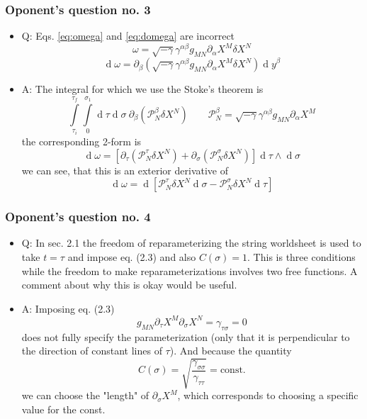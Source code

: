 \documentclass[11pt]{beamer}
\newcommand{\D}[1]{\ensuremath{\operatorname{d}\!{#1}}}
\newcommand{\difs}[3][]{\partial_{#3}^{#1}{#2}}
\newcommand{\lp}{\left(}
\newcommand{\rp}{\right)}
\begin{document}
\begin{frame}
\frametitle{Oponent's question no. 3}
\begin{itemize}
	\item Q: Eqs. \eqref{eq:omega} and \eqref{eq:domega} are incorrect
	\begin{equation}
	\tag{1.19} \label{eq:omega}
	\omega = \sqrt{- \gamma} \gamma^{\alpha \beta} g_{MN} \difs[]{X^M}{\alpha} \delta X^N
	\end{equation}
	\begin{equation}
	\tag{1.20} \label{eq:domega}
	\D \omega = \difs{\lp \sqrt{- \gamma} \gamma^{\alpha \beta} g_{MN} \difs[]{X^M}{\alpha} \delta X^N \rp} {\beta} \D y^{\beta}
	\end{equation}
	\item A: The integral for which we use the Stoke's theorem is
	$$
	\int\limits_{\tau_i}^{\tau_f} \int\limits_{0}^{\sigma_1} \D \tau \D \sigma ~ \difs{\lp \mathcal{P}_N^{\beta} \delta X^N \rp } {\beta} \qquad \mathcal{P}_N^{\beta} = \sqrt{- \gamma} \gamma^{\alpha \beta} g_{MN} \difs[]{X^M}{\alpha}
	$$
	the corresponding 2-form is
	$$
	\D \omega = \left[ \difs{\lp \mathcal{P}_N^{\tau} \delta X^N \rp } {\tau} + \difs{\lp \mathcal{P}_N^{\sigma} \delta X^N \rp } {\sigma} \right] \D \tau \wedge \D \sigma
	$$
	we can see, that this is an exterior derivative of
	$$
	\D \omega = \D {\left[ \mathcal{P}_N^{\tau} \delta X^N \D \sigma - \mathcal{P}_N^{\sigma} \delta X^N \D \tau \right]}
	$$
\end{itemize}
\end{frame}


\begin{frame}
\frametitle{Oponent's question no. 4}
\begin{itemize}
	\item Q: In sec. 2.1 the freedom of reparameterizing the string worldsheet is used to take $t = \tau$
	and impose eq. (2.3) and also $C(\sigma) = 1$. This is three conditions while the freedom
	to make reparameterizations involves two free functions. A comment about why this
	is okay would be useful.
	\item A: Imposing eq. (2.3)
	\begin{equation}\tag{2.3}
		g_{MN} \difs {X^M}{\tau} \difs {X^N}{\sigma} = \gamma_{\tau \sigma} = 0
	\end{equation}
	does not fully specify the parameterization (only that it is perpendicular to the direction of constant lines of $\tau$). And because the quantity
	$$
	C(\sigma) = \sqrt{\frac{\gamma_{\sigma \sigma}}{\gamma_{\tau \tau}}} = \text{const.}
	$$
	we can choose the "length" of $\difs {X^M} {\sigma}$, which corresponds to choosing a specific value for the const.
\end{itemize}
\end{frame}
\end{document}
